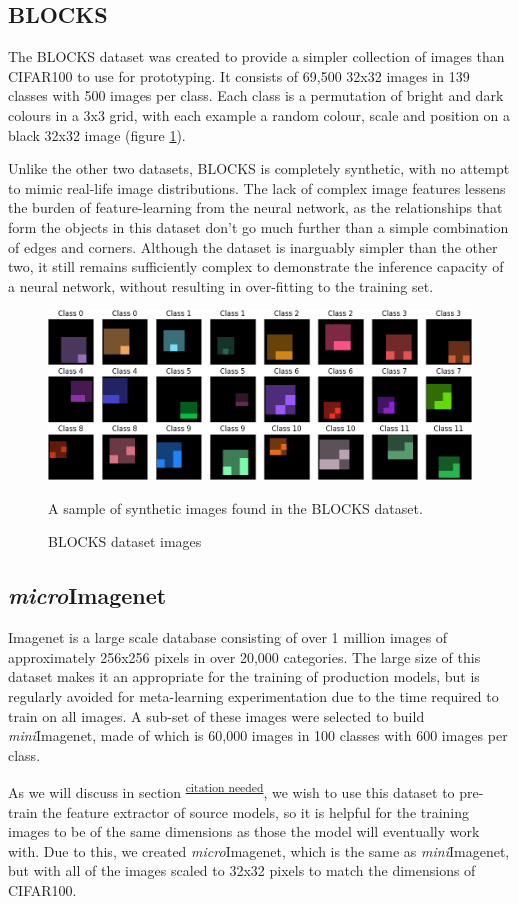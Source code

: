 \documentclass{report}
\newcommand{\TOCITE}[2][citation needed]{\textsuperscript{\underline{#1}}}
\begin{document}
\subsection{BLOCKS}
The BLOCKS dataset was created to provide a simpler collection of images than CIFAR100 to use for prototyping. It consists of 69,500 32x32 images in 139 classes with 500 images per class. Each class is a permutation of bright and dark colours in a 3x3 grid, with each example a random colour, scale and position on a black 32x32 image (figure \ref{fig:blocks:1}). \par
Unlike the other two datasets, BLOCKS is completely synthetic, with no attempt to mimic real-life image distributions. The lack of complex image features lessens the burden of feature-learning from the neural network, as the relationships that form the objects in this dataset don't go much further than a simple combination of edges and corners. Although the dataset is inarguably simpler than the other two, it still remains sufficiently complex to demonstrate the inference capacity of a neural network, without resulting in over-fitting to the training set.
\begin{figure}[h]
	\centering
	\includegraphics[width=15cm]{blocks}
	\caption{BLOCKS dataset images}
	A sample of synthetic images found in the BLOCKS dataset.
	\label{fig:blocks:1}
\end{figure}
\subsection{\textit{micro}Imagenet}
Imagenet\parencite{ilsvr} is a large scale database consisting of over 1 million images of approximately 256x256 pixels in over 20,000 categories. The large size of this dataset makes it an appropriate for the training of production models, but is regularly avoided for meta-learning experimentation due to the time required to train on all images. A sub-set of these images were selected to build \textit{mini}Imagenet, made of which is 60,000 images in 100 classes with 600 images per class. \par
As we will discuss in section \TOCITE{}, we wish to use this dataset to pre-train the feature extractor of source models, so it is helpful for the training images to be of the same dimensions as those the model will eventually work with. Due to this, we created \textit{micro}Imagenet, which is the same as \textit{mini}Imagenet, but with all of the images scaled to 32x32 pixels to match the dimensions of CIFAR100.
\end{document}
